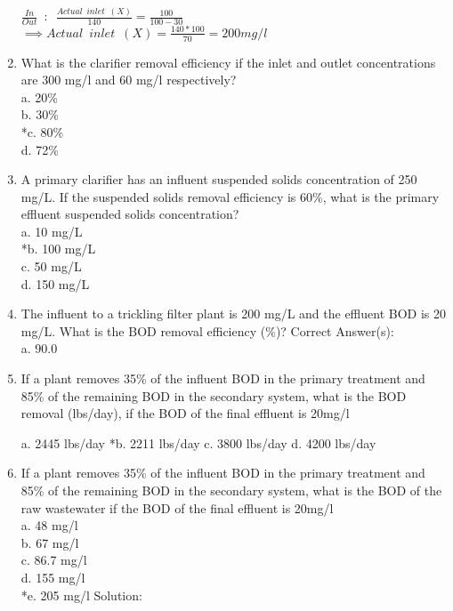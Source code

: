 \documentclass{article}
\begin{document}
\begin{enumerate}
$\frac{In}{Out} \enspace : \enspace \frac{Actual \enspace inlet \enspace  (X)}{140}=\frac{100}{100-30}$\\
$\implies Actual \enspace inlet \enspace  (X)=\frac{140*100}{70}=\boxed{200mg/l}$\\

\item What is the clarifier removal efficiency if the inlet and outlet concentrations are 300 mg/l and 60 mg/l respectively?\\

a. 20\%\\
b. 30\%\\
*c. 80\%\\
d. 72\%


\item A primary clarifier has an influent suspended solids concentration of 250 mg/L. If the suspended solids removal efficiency is 60\%, what is the primary effluent suspended solids concentration?\\

a. 10 mg/L\\
*b. 100 mg/L\\
c. 50 mg/L\\
d. 150 mg/L

\item The influent to a trickling filter plant is 200 mg/L and the effluent BOD is 20 mg/L. What is the BOD removal efficiency (\%)?
Correct Answer(s):\\
a. 90.0


\item If a plant removes 35\% of the influent BOD in the primary treatment and 85\% of the remaining BOD in the secondary system, what is the BOD removal (lbs/day), if the BOD of the final effluent is 20mg/l 

a. 2445 lbs/day 
*b. 2211 lbs/day 
c. 3800 lbs/day 
d. 4200 lbs/day 


\item If a plant removes 35\% of the influent BOD in the primary treatment and 85\% of the remaining BOD in the secondary system, what is the BOD of the raw wastewater if the BOD of the final effluent is 20mg/l \\

a. 48 mg/l \\
b. 67 mg/l \\
c. 86.7 mg/l \\
d. 155 mg/l \\
*e. 205 mg/l
Solution:\\


\end{enumerate}
\end{document}
